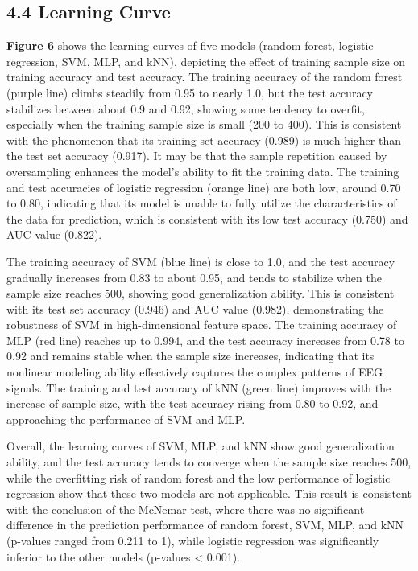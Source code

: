 \documentclass[
  doc]{apa6}
\begin{document}
\subsection{4.4 Learning Curve}\label{learning-curve}

\textbf{Figure 6} shows the learning curves of five models (random forest, logistic regression, SVM, MLP, and kNN), depicting the effect of training sample size on training accuracy and test accuracy. The training accuracy of the random forest (purple line) climbs steadily from 0.95 to nearly 1.0, but the test accuracy stabilizes between about 0.9 and 0.92, showing some tendency to overfit, especially when the training sample size is small (200 to 400). This is consistent with the phenomenon that its training set accuracy (0.989) is much higher than the test set accuracy (0.917). It may be that the sample repetition caused by oversampling enhances the model's ability to fit the training data. The training and test accuracies of logistic regression (orange line) are both low, around 0.70 to 0.80, indicating that its model is unable to fully utilize the characteristics of the data for prediction, which is consistent with its low test accuracy (0.750) and AUC value (0.822).

The training accuracy of SVM (blue line) is close to 1.0, and the test accuracy gradually increases from 0.83 to about 0.95, and tends to stabilize when the sample size reaches 500, showing good generalization ability. This is consistent with its test set accuracy (0.946) and AUC value (0.982), demonstrating the robustness of SVM in high-dimensional feature space. The training accuracy of MLP (red line) reaches up to 0.994, and the test accuracy increases from 0.78 to 0.92 and remains stable when the sample size increases, indicating that its nonlinear modeling ability effectively captures the complex patterns of EEG signals. The training and test accuracy of kNN (green line) improves with the increase of sample size, with the test accuracy rising from 0.80 to 0.92, and approaching the performance of SVM and MLP.

Overall, the learning curves of SVM, MLP, and kNN show good generalization ability, and the test accuracy tends to converge when the sample size reaches 500, while the overfitting risk of random forest and the low performance of logistic regression show that these two models are not applicable. This result is consistent with the conclusion of the McNemar test, where there was no significant difference in the prediction performance of random forest, SVM, MLP, and kNN (p-values ranged from 0.211 to 1), while logistic regression was significantly inferior to the other models (p-values \textless{} 0.001).
\end{document}
